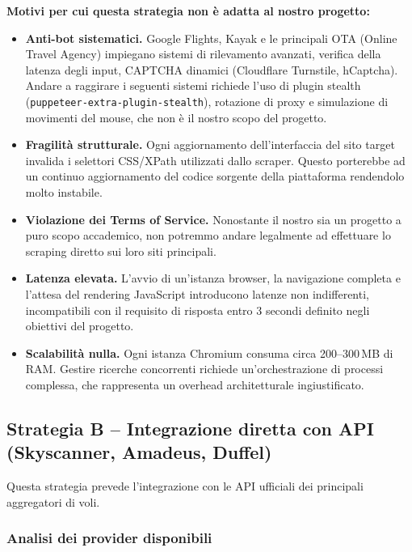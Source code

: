 \documentclass[a4paper, 11pt]{article}
\begin{document}
\begin{conbox}
\textbf{Motivi per cui questa strategia non \`e adatta al nostro progetto:}
\begin{itemize}
  \item \textbf{Anti-bot sistematici.} Google Flights, Kayak e le principali OTA (Online Travel Agency) impiegano sistemi di rilevamento avanzati, verifica della latenza degli input, CAPTCHA dinamici (Cloudflare Turnstile, hCaptcha). Andare a raggirare i seguenti sistemi richiede l'uso di plugin stealth (\texttt{puppeteer-extra-plugin-stealth}), rotazione di proxy e simulazione di movimenti del mouse, che non è il nostro scopo del progetto.
  \item \textbf{Fragilit\`a strutturale.} Ogni aggiornamento dell'interfaccia del sito target invalida i selettori CSS/XPath utilizzati dallo scraper. Questo porterebbe ad un continuo aggiornamento del codice sorgente della piattaforma rendendolo molto instabile.
  \item \textbf{Violazione dei Terms of Service.} Nonostante il nostro sia un progetto a puro scopo accademico, non potremmo andare legalmente ad effettuare lo scraping  diretto sui loro siti principali.
  \item \textbf{Latenza elevata.} L'avvio di un'istanza browser, la navigazione completa e l'attesa del rendering JavaScript introducono latenze non indifferenti, incompatibili con il requisito di risposta entro 3 secondi definito negli obiettivi del progetto.
  \item \textbf{Scalabilit\`a nulla.} Ogni istanza Chromium consuma circa 200--300\,MB di RAM. Gestire ricerche concorrenti richiede un'orchestrazione di processi complessa, che rappresenta un overhead architetturale ingiustificato.
\end{itemize}
\end{conbox}

\subsection{Strategia B -- Integrazione diretta con API (Skyscanner, Amadeus, Duffel)}

Questa strategia prevede l'integrazione con le API ufficiali dei principali aggregatori di voli.

\subsubsection{Analisi dei provider disponibili}
\end{document}
